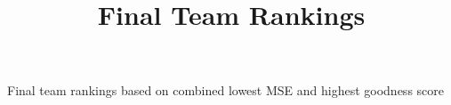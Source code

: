 \documentclass[11pt, oneside]{article}   	%
\title{Final Team Rankings}
\date{}
\begin{document}
\maketitle

\begin{table}[htbp] %
   \centering
   \caption{Final team rankings based on combined lowest MSE and highest goodness score}
   \scalebox{0.75}{}
   \label{tab:table}
\end{table}
\end{document}
